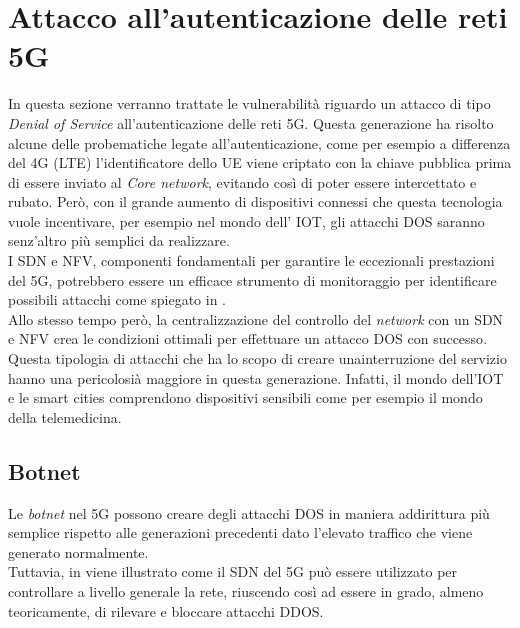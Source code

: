 \section{Attacco all'autenticazione delle reti 5G}
In questa sezione verranno trattate le vulnerabilità riguardo un attacco di tipo \textit{Denial of Service} all'autenticazione delle reti 5G.
Questa generazione ha risolto alcune delle probematiche legate all'autenticazione, come per esempio a differenza del 4G (LTE) l'identificatore 
dello UE viene criptato con la chiave pubblica prima di essere inviato al \textit{Core network}, evitando così di poter essere intercettato e rubato\cite{5g-vs-4g}.
Però, con il grande aumento di dispositivi connessi che questa tecnologia vuole incentivare, per esempio nel mondo dell' IOT, gli attacchi DOS saranno senz'altro più 
semplici da realizzare.\\
I SDN e NFV, componenti fondamentali per garantire le eccezionali prestazioni del 5G, potrebbero essere un efficace strumento di monitoraggio per identificare possibili 
attacchi come spiegato in \cite{dos-detection-with-sdn}.\\
Allo stesso tempo però, la centralizzazione del controllo del \textit{network} con un SDN e NFV crea le condizioni ottimali per effettuare un attacco DOS con successo\cite{5g-dos}.\\
Questa tipologia di attacchi che ha lo scopo di creare unainterruzione del servizio hanno una pericolosià maggiore in questa generazione. Infatti, il mondo dell'IOT e le smart cities comprendono 
dispositivi sensibili come per esempio il mondo della telemedicina.

\subsection{Botnet}
Le \textit{botnet} nel 5G possono creare degli attacchi DOS in maniera addirittura più semplice rispetto alle generazioni precedenti dato l'elevato traffico che viene generato normalmente.\\
Tuttavia, in \cite{dos-detection-with-sdn} viene illustrato come il SDN del 5G può essere utilizzato per controllare a livello generale la rete, riuscendo così ad essere in grado, almeno teoricamente, 
di rilevare e bloccare attacchi DDOS.

